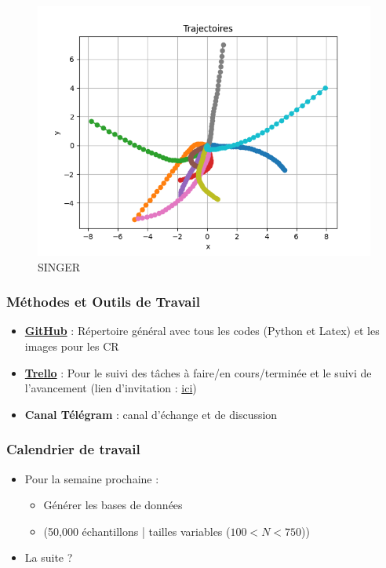 \documentclass{beamer}
\begin{document}
\begin{frame}
\begin{figure}
\begin{minipage}{0.3\textwidth}
        \centering
        \includegraphics[width=\textwidth]{images/SINGER_Trajectoires.png}
        \caption{SINGER}
    \end{minipage}
\end{figure}
\end{frame}

\begin{frame}
    \frametitle{Méthodes et Outils de Travail}
    \begin{itemize}
        \item \textbf{\href{https://github.com/Feulym/ProjetS8_TRACK_2425}{GitHub}} : Répertoire général avec tous les codes (Python et Latex) et les images pour les CR
        \item \textbf{\href{https://trello.com/b/AcVzNkta/projet-s8-track}{Trello}} : Pour le suivi des tâches à faire/en cours/terminée et le suivi de l'avancement (lien d'invitation : \href{https://trello.com/invite/b/67936f0df0a78c335e0e61e9/ATTIa74f84297b27934504d49c129702a97d20B0A929/projet-s8-track}{ici})
        \item \textbf{Canal Télégram} : canal d'échange et de discussion
    \end{itemize}
\end{frame}

\begin{frame}
  \frametitle{Calendrier de travail}
    \begin{itemize}
        \item Pour la semaine prochaine : 
        \begin{itemize}
            \item[\hspace{1cm}] Générer les bases de données 
            \item[\hspace{2cm}] (50,000 échantillons | tailles variables ($100 < N < 750$))
        \end{itemize}
        \item La suite ?
    \end{itemize}
\end{frame}
\end{document}
